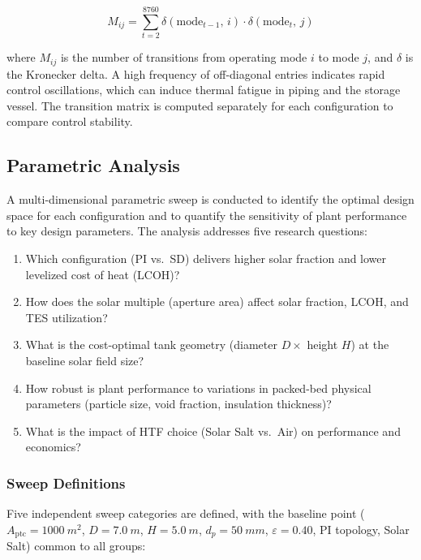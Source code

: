 \documentclass[11pt,review,3p]{elsarticle}
\begin{document}
\begin{equation}
    M_{ij} = \sum_{t=2}^{8760} \delta(\text{mode}_{t-1},\,i) \cdot \delta(\text{mode}_{t},\,j)
    \label{eq:markov}
\end{equation}

where $M_{ij}$ is the number of transitions from operating mode $i$ to mode $j$, and $\delta$ is the Kronecker delta. A high frequency of off-diagonal entries indicates rapid control oscillations, which can induce thermal fatigue in piping and the storage vessel. The transition matrix is computed separately for each configuration to compare control stability.

\subsection{Parametric Analysis}
\label{sec:parametric}

A multi-dimensional parametric sweep is conducted to identify the optimal design space for each configuration and to quantify the sensitivity of plant performance to key design parameters. The analysis addresses five research questions:

\begin{enumerate}[leftmargin=*, itemsep=2pt]
    \item Which configuration (PI vs.~SD) delivers higher solar fraction and lower levelized cost of heat (LCOH)?
    \item How does the solar multiple (aperture area) affect solar fraction, LCOH, and TES utilization?
    \item What is the cost-optimal tank geometry (diameter $D \times$ height $H$) at the baseline solar field size?
    \item How robust is plant performance to variations in packed-bed physical parameters (particle size, void fraction, insulation thickness)?
    \item What is the impact of HTF choice (Solar Salt vs.~Air) on performance and economics?
\end{enumerate}

\subsubsection{Sweep Definitions}
\label{sec:sweep_defs}

Five independent sweep categories are defined, with the baseline point ($A_{\text{ptc}} = \SI{1000}{m^2}$, $D = \SI{7.0}{m}$, $H = \SI{5.0}{m}$, $d_p = \SI{50}{mm}$, $\varepsilon = 0.40$, PI topology, Solar Salt) common to all groups:
\end{document}
